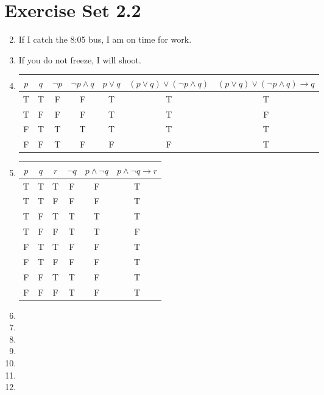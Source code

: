 \documentclass[12pt]{article}
\begin{document}
\section*{Exercise Set 2.2}
\begin{enumerate}
\setcounter{enumi}{1}
\item %
If I catch the 8:05 bus, I am on time for work.
\item %
If you do not freeze, I will shoot.
\setcounter{enumi}{5} %
\item
\begin{tabular} {|c|c||c|c|c|c|c|}
\hline
$p$ & $q$ & $\neg p$ & $\neg p \wedge q$ & $p \vee q$ & $(p \vee q) \vee (\neg p \wedge q)$ & $(p \vee q) \vee
(\neg p \wedge q) \rightarrow q$\\ \hline
T & T & F & F & T & T & T\\
T & F & F & F & T & T & F\\
F & T & T & T & T & T & T\\
F & F & T & F & F & F & T\\ \hline
\end{tabular}

\item %
\begin{tabular} {|c|c|c||c|c|c|}
\hline
$p$ & $q$ & $r$ & $\neg q$ & $p \wedge \neg q$ & $p \wedge \neg q \rightarrow r$\\ \hline
T & T & T & F & F & T\\
T & T & F & F & F & T\\
T & F & T & T & T & T\\
T & F & F & T & T & F\\ 
F & T & T & F & F & T\\
F & T & F & F & F & T\\
F & F & T & T & F & T\\
F & F & F & T & F & T\\ \hline
\end{tabular}

\setcounter{enumi}{14} %
\item 
\setcounter{enumi}{17} %
\item 
\setcounter{enumi}{20} %
\item 
\setcounter{enumi}{32} %
\item 
\setcounter{enumi}{34} %
\item 
\setcounter{enumi}{40} %
\item 
\setcounter{enumi}{42} %
\item 
\end{enumerate}
\end{document}
